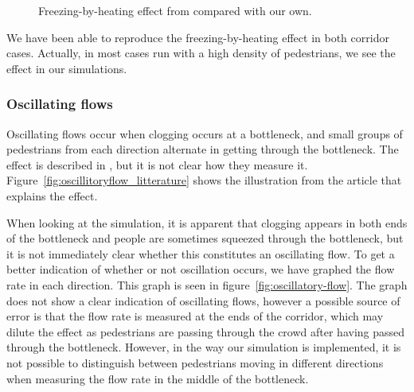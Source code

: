 \begin{figure}[h]
    \centering
    \caption[Freezing-by-heating effect from \cite{oscil} compared with our 
    own.]{Freezing-by-heating effect from \cite{oscil} compared with our own.}
    \label{fig:freezing_by_heating_litterature}
\end{figure}

We have been able to reproduce the freezing-by-heating effect in both corridor 
cases. Actually, in most cases run with a high density of pedestrians, we see 
the effect in our simulations.  

\subsubsection{Oscillating flows}
Oscillating flows occur when clogging occurs at a bottleneck, and small groups 
of pedestrians from each direction alternate in getting through the 
bottleneck. The effect is described in \cite{oscil}, but it is not clear how 
they measure it. Figure~\vref{fig:oscillitoryflow_litterature} shows the 
illustration from the article that explains the effect.

When looking at the simulation, it is apparent that clogging appears in both 
ends of the bottleneck and people are sometimes squeezed through the 
bottleneck, but it is not immediately clear whether this constitutes an 
oscillating flow.  To get a better indication of whether or not oscillation 
occurs, we have graphed the flow rate in each direction. This graph is seen in 
figure~\ref{fig:oscillatory-flow}. The graph does not show a clear indication 
of oscillating flows, however a possible source of error is that the flow rate 
is measured at the ends of the corridor, which may dilute the effect as 
pedestrians are passing through the crowd after having passed through the 
bottleneck. However, in the way our simulation is implemented, it is not 
possible to distinguish between pedestrians moving in different directions 
when measuring the flow rate in the middle of the bottleneck.

